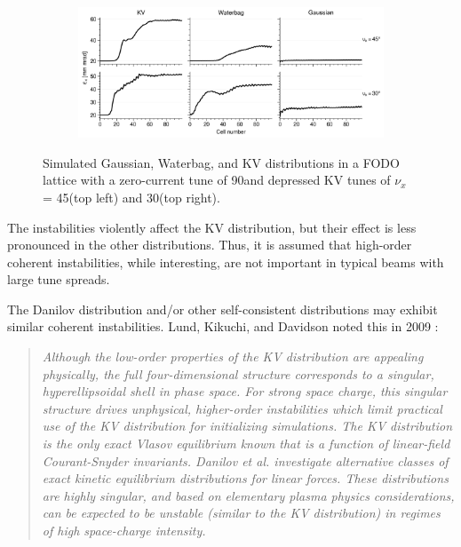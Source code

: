 \begin{figure}[!p]
\begin{subfigure}[b]{0.47\textwidth}
        \label{fig:f2}
    \end{subfigure}
    \vfill
    \begin{subfigure}[b]{\textwidth}
        \centering
        \includegraphics[width=\textwidth]{Images/chapter1/coherent_instability_emittances.png}
        \label{fig:coherent_instabilities_b}
    \end{subfigure}
    \caption{Simulated Gaussian, Waterbag, and KV distributions in a FODO lattice with a zero-current tune of 90\degree and depressed KV tunes of $\nu_x$ = 45\degree (top left) and 30\degree (top right).}
    \label{fig:coherent_instabilities}
\end{figure}
%
The instabilities violently affect the KV distribution, but their effect is less pronounced in the other distributions. Thus, it is assumed that high-order coherent instabilities, while interesting, are not important in typical beams with large tune spreads.

The Danilov distribution and/or other self-consistent distributions may exhibit similar coherent instabilities. Lund, Kikuchi, and Davidson noted this in 2009 \cite{Lund2009}:
\begin{quote}
    \textit{Although the low-order properties of the KV distribution are appealing physically, the full four-dimensional structure corresponds to a singular, hyperellipsoidal shell in phase space. For strong space charge, this singular structure drives unphysical, higher-order instabilities which limit practical use of the KV distribution for initializing simulations. The KV distribution is the only exact Vlasov equilibrium known that is a function of linear-field Courant-Snyder invariants. Danilov et al. \cite{Danilov2003} investigate alternative classes of exact kinetic equilibrium distributions for linear forces. These distributions are highly singular, and based on elementary plasma physics considerations, can be expected to be unstable (similar to the KV distribution) in regimes of high space-charge intensity.}
\end{quote}